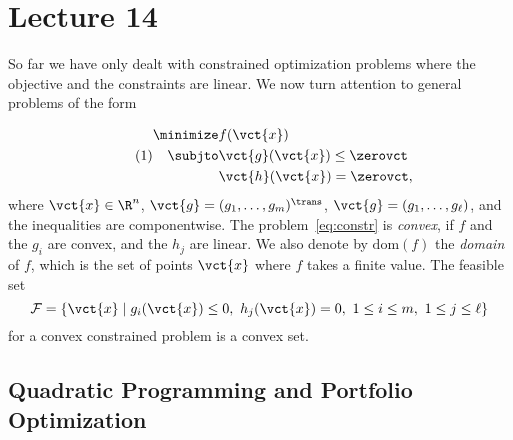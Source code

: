 %
%
% 


\chapter*{Lecture 14}
\addtocounter{chapter}{14}


So far we have only dealt with constrained optimization problems where the objective and the constraints are linear. We now turn attention to general problems of the form

\begin{align*}\label{eq:constr}\tag{1}
\begin{split}
 \minimize & f(\vct{x})\\
 \subjto & \vct{g}(\vct{x})\leq \zerovct\\
         & \vct{h}(\vct{x})= \zerovct,
\end{split}
\end{align*}
where $\vct{x}\in \R^n$, $\vct{g}=(g_1,\dots,g_m)^{\trans}$, $\vct{g}=(g_1,\dots,g_{\ell})$, and the inequalities are componentwise. 
The problem~\eqref{eq:constr} is {\em convex}, if $f$ and the $g_i$ are convex, and the $h_j$ are linear. We also denote by $\mathrm{dom}(f)$ the {\em domain} of $f$, which is the set of points $\vct{x}$ where $f$ takes a finite value. The feasible set
\begin{equation*}
 \mathcal{F} = \{\vct{x} \mid g_i(\vct{x})\leq 0, \ h_j(\vct{x})=0, \ 1\leq i\leq m, \ 1\leq j\leq \ell\}
\end{equation*}
for a convex constrained problem is a convex set.

\section{Quadratic Programming and Portfolio Optimization}


